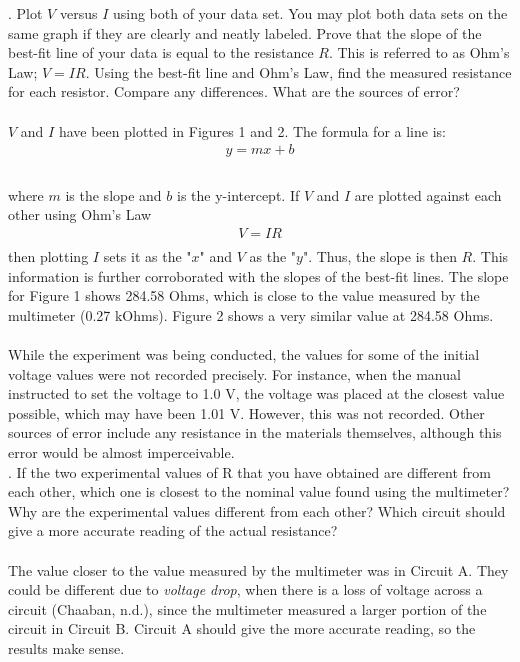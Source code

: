 \documentclass [12pt, letterpaper, twoside] {article}
\begin{document}
. Plot \(V\) versus \(I\) using both of your data set. You may plot both data sets on the same graph if they are clearly and neatly labeled. Prove that the slope of the best-fit line of your data is equal to the resistance \(R\). This is referred to as Ohm’s Law; \(V = IR\). Using the best-fit line and Ohm’s Law, find the measured resistance for each resistor. Compare any differences. What are the sources of error? \\\\
\(V\) and \(I\) have been plotted in Figures 1 and 2. The formula for a line is:
\begin{equation*}
  \begin{split}
    y = mx + b \\
  \end{split}
\end{equation*} \\
where \(m\) is the slope and \(b\) is the y-intercept. If \(V\) and \(I\) are plotted against each other using Ohm's Law
\begin{equation}
  \begin{split}
    V = IR \\
  \end{split}
\end{equation}
then plotting \(I\) sets it as the "\(x\)" and \(V\) as the "\(y\)". Thus, the slope is then \(R\). This information is further corroborated with the slopes of the best-fit lines. The slope for Figure 1 shows 284.58 Ohms, which is close to the value measured by the multimeter (0.27 kOhms). Figure 2 shows a very similar value at 284.58 Ohms. \\\\
While the experiment was being conducted, the values for some of the initial voltage values were not recorded precisely. For instance, when the manual instructed to set the voltage to 1.0 V, the voltage was placed at the closest value possible, which may have been 1.01 V. However, this was not recorded. Other sources of error include any resistance in the materials themselves, although this error would be almost imperceivable. \\

. If the two experimental values of R that you have obtained are different from each other, which one is closest to the nominal value found using the multimeter?  Why are the experimental values different from each other?  Which circuit should give a more accurate reading of the actual resistance? \\\\
The value closer to the value measured by the multimeter was in Circuit A. They could be different due to \textit{voltage drop}, when there is a loss of voltage across a circuit (Chaaban, n.d.), since the multimeter measured a larger portion of the circuit in Circuit B. Circuit A should give the more accurate reading, so the results make sense.
\end{document}
